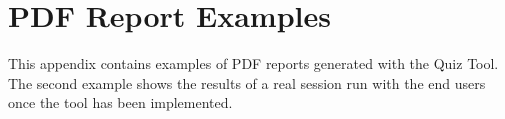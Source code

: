 \chapter{PDF Report Examples}
\label{chap:pdfreports}

This appendix contains examples of PDF reports generated with the Quiz Tool.
The second example shows the results of a real session run with the end users
once the tool has been implemented.



